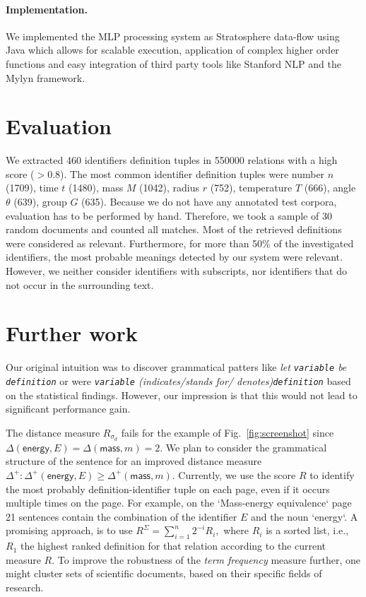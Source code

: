 \documentclass[runningheads]{llncs}
\begin{document}
\paragraph{Implementation.}
We implemented the MLP processing system \cite{github} as Stratosphere data-flow using Java which allows for scalable execution, application of complex higher order functions and easy integration of third party tools like Stanford NLP and the Mylyn framework.
\section{Evaluation}
We extracted 460 identifiers definition tuples in 550000 relations with a
high score ($>0.8$).  The most common identifier definition tuples were 
number $n$ (1709), time $t$ (1480), mass $M$ (1042), radius $r$ (752), 
temperature $T$ (666), angle $\theta$ (639), group $G$ (635).
Because we do not have any annotated test corpora,
evaluation has to be performed by hand.
Therefore, we took a sample of 30
random documents and counted all matches.
Most of the retrieved definitions were considered as relevant.
Furthermore, for more than 50\% of the investigated identifiers, 
the most probable meanings detected by our system were relevant.
However, we neither consider identifiers with subscripts, nor identifiers that do not occur in the surrounding text.  



\section{Further work}
Our original intuition was to discover grammatical patters 
like \emph{let \texttt{variable} be \texttt{definition}} or 
were \emph{\texttt{variable} (indicates/stands for/ denotes)\texttt{definition}} based on the statistical findings.
However, our impression is that this 
would not lead to significant performance gain.

The distance measure
$R_{\sigma_d}$
fails for the example of Fig.~\ref{fig:screenshot} since
$\Delta(\mathsf{energy},E)=\Delta(\mathsf{mass},m)=2$.
We plan to consider the grammatical structure of the sentence for an improved distance measure $\Delta^{+} : \Delta^+(\mathsf{energy},E)\ge\Delta^+(\mathsf{mass},m)$.
Currently, we use the score $R$ to identify the most probably definition-identifier tuple on each page, even if it occurs multiple times on the page.
For example, on the `Mass-energy equivalence` page 21 sentences contain the combination of the identifier $E$ and the noun `energy`.
A promising approach, is to use $R^\Sigma=\sum_{i=1}^n 2^{-i} R_i,$ where $R_i$ is a 
sorted list, i.e., $R_1$ the highest ranked definition for that relation according to the current measure $R$.
To improve the robustness of the \emph{term frequency} measure further, one
might cluster sets of scientific documents, based on their specific fields of
research.
\end{document}
